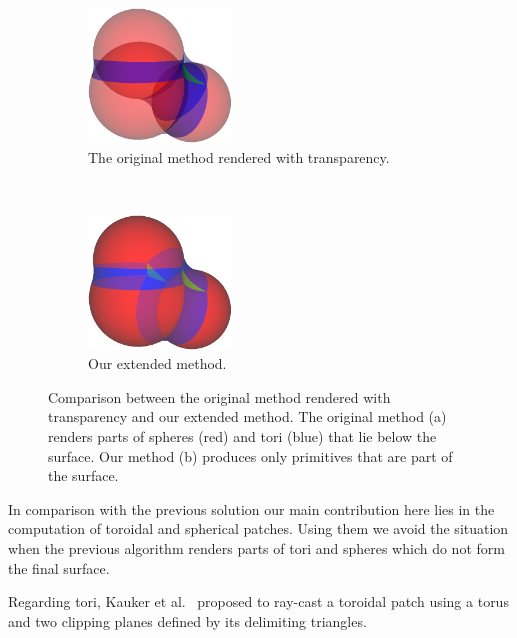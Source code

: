 \begin{figure}[htp]
  \centering
  \begin{subfigure}[t]{0.48\columnwidth}
    \centering
    \includegraphics[width=1.5in]{image/cb-krone.png}
    \caption{The original method \cite{krone2011parallel} rendered with transparency.}
		\label{fig:cb-krone}
  \end{subfigure}%
  ~
  \begin{subfigure}[t]{0.48\columnwidth}
    \centering
    \includegraphics[width=1.5in]{image/cb-oit.png}
    \caption{Our extended method.}
  \end{subfigure}
\caption{Comparison between the original method rendered with transparency and our extended method.
The original method (a) renders parts of spheres (red) and tori (blue) that lie below the surface.
Our method (b) produces only primitives that are part of the surface.
}
\end{figure}

In comparison with the previous solution our main contribution here lies in the computation of toroidal and spherical patches.
Using them we avoid the situation when the previous algorithm renders parts of tori and spheres which do not form the final surface.

Regarding tori, Kauker et al.~\cite{kauker2013rendering} proposed to ray-cast a toroidal patch using a torus and two clipping planes defined by its delimiting triangles.

